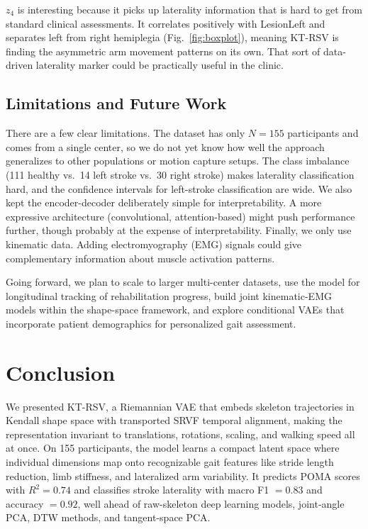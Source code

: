 \documentclass{article}
\begin{document}
$z_4$ is interesting because it picks up laterality information that is hard to get from standard clinical assessments. It correlates positively with LesionLeft and separates left from right hemiplegia (Fig.~\ref{fig:boxplot}), meaning KT-RSV is finding the asymmetric arm movement patterns on its own. That sort of data-driven laterality marker could be practically useful in the clinic.

\subsection{Limitations and Future Work}
There are a few clear limitations. The dataset has only $N = 155$ participants and comes from a single center, so we do not yet know how well the approach generalizes to other populations or motion capture setups. The class imbalance (111 healthy vs.\ 14 left stroke vs.\ 30 right stroke) makes laterality classification hard, and the confidence intervals for left-stroke classification are wide. We also kept the encoder-decoder deliberately simple for interpretability. A more expressive architecture (convolutional, attention-based) might push performance further, though probably at the expense of interpretability. Finally, we only use kinematic data. Adding electromyography (EMG) signals could give complementary information about muscle activation patterns.

Going forward, we plan to scale to larger multi-center datasets, use the model for longitudinal tracking of rehabilitation progress, build joint kinematic-EMG models within the shape-space framework, and explore conditional VAEs that incorporate patient demographics for personalized gait assessment.

\section{Conclusion}
\label{sec:conclusion}

We presented KT-RSV, a Riemannian VAE that embeds skeleton trajectories in Kendall shape space with transported SRVF temporal alignment, making the representation invariant to translations, rotations, scaling, and walking speed all at once. On 155 participants, the model learns a compact latent space where individual dimensions map onto recognizable gait features like stride length reduction, limb stiffness, and lateralized arm variability. It predicts POMA scores with $R^2 = 0.74$ and classifies stroke laterality with macro F1 $= 0.83$ and accuracy $= 0.92$, well ahead of raw-skeleton deep learning models, joint-angle PCA, DTW methods, and tangent-space PCA.
\end{document}

